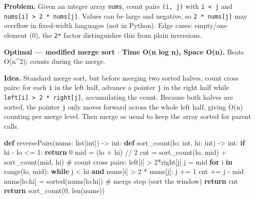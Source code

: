 \documentclass[11pt]{article}
\newenvironment{Shaded}{\begin{snugshade}}{\end{snugshade}}
\newcommand{\BuiltInTok}[1]{\textcolor[rgb]{0.50,0.55,0.55}{#1}}
\newcommand{\CommentTok}[1]{\textcolor[rgb]{0.48,0.49,0.49}{#1}}
\newcommand{\ControlFlowTok}[1]{\textcolor[rgb]{0.99,0.74,0.29}{\textbf{#1}}}
\newcommand{\DecValTok}[1]{\textcolor[rgb]{0.96,0.45,0.00}{#1}}
\newcommand{\KeywordTok}[1]{\textcolor[rgb]{0.81,0.81,0.76}{\textbf{#1}}}
\newcommand{\NormalTok}[1]{\textcolor[rgb]{0.81,0.81,0.76}{#1}}
\newcommand{\OperatorTok}[1]{\textcolor[rgb]{0.81,0.81,0.76}{#1}}
\begin{document}
\textbf{Problem.} Given an integer array \texttt{nums}, count pairs \texttt{(i,\ j)} with \texttt{i\ \textless{}\ j} and \texttt{nums{[}i{]}\ \textgreater{}\ 2\ *\ nums{[}j{]}}. Values can be large and negative, so \texttt{2\ *\ nums{[}j{]}} may overflow in fixed-width languages (not in Python). Edge cases: empty/one element (0), the \texttt{2*} factor distinguishes this from plain inversions.

\textbf{Optimal --- modified merge sort \(\cdot\) Time O(n log n), Space O(n).} Beats O(n\^{}2); counts during the merge.

\textbf{Idea.} Standard merge sort, but before merging two sorted halves, count cross pairs: for each \texttt{i} in the left half, advance a pointer \texttt{j} in the right half while \texttt{left{[}i{]}\ \textgreater{}\ 2\ *\ right{[}j{]}}, accumulating the count. Because both halves are sorted, the pointer \texttt{j} only moves forward across the whole left half, giving O(n) counting per merge level. Then merge as usual to keep the array sorted for parent calls.


\begin{Shaded}
\begin{Highlighting}[]
\KeywordTok{def}\NormalTok{ reversePairs(nums: }\BuiltInTok{list}\NormalTok{[}\BuiltInTok{int}\NormalTok{]) }\OperatorTok{{-}\textgreater{}} \BuiltInTok{int}\NormalTok{:}
    \KeywordTok{def}\NormalTok{ sort\_count(lo: }\BuiltInTok{int}\NormalTok{, hi: }\BuiltInTok{int}\NormalTok{) }\OperatorTok{{-}\textgreater{}} \BuiltInTok{int}\NormalTok{:}
        \ControlFlowTok{if}\NormalTok{ hi }\OperatorTok{{-}}\NormalTok{ lo }\OperatorTok{\textless{}=} \DecValTok{1}\NormalTok{:}
            \ControlFlowTok{return} \DecValTok{0}
\NormalTok{        mid }\OperatorTok{=}\NormalTok{ (lo }\OperatorTok{+}\NormalTok{ hi) }\OperatorTok{//} \DecValTok{2}
\NormalTok{        cnt }\OperatorTok{=}\NormalTok{ sort\_count(lo, mid) }\OperatorTok{+}\NormalTok{ sort\_count(mid, hi)}
        \CommentTok{\# count cross pairs: left[i] \textgreater{} 2*right[j]}
\NormalTok{        j }\OperatorTok{=}\NormalTok{ mid}
        \ControlFlowTok{for}\NormalTok{ i }\KeywordTok{in} \BuiltInTok{range}\NormalTok{(lo, mid):}
            \ControlFlowTok{while}\NormalTok{ j }\OperatorTok{\textless{}}\NormalTok{ hi }\KeywordTok{and}\NormalTok{ nums[i] }\OperatorTok{\textgreater{}} \DecValTok{2} \OperatorTok{*}\NormalTok{ nums[j]:}
\NormalTok{                j }\OperatorTok{+=} \DecValTok{1}
\NormalTok{            cnt }\OperatorTok{+=}\NormalTok{ j }\OperatorTok{{-}}\NormalTok{ mid}
\NormalTok{        nums[lo:hi] }\OperatorTok{=} \BuiltInTok{sorted}\NormalTok{(nums[lo:hi])   }\CommentTok{\# merge step (sort the window)}
        \ControlFlowTok{return}\NormalTok{ cnt}
    \ControlFlowTok{return}\NormalTok{ sort\_count(}\DecValTok{0}\NormalTok{, }\BuiltInTok{len}\NormalTok{(nums))}
\end{Highlighting}
\end{Shaded}
\end{document}
